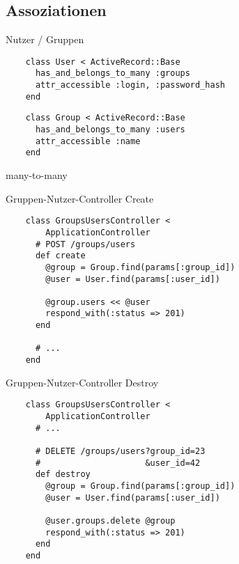 \subsection{Assoziationen}

\begin{frame}[fragile]{Nutzer / Gruppen}
  \begin{lstlisting}
    class User < ActiveRecord::Base
      has_and_belongs_to_many :groups
      attr_accessible :login, :password_hash
    end
  \end{lstlisting}

  \begin{lstlisting}
    class Group < ActiveRecord::Base
      has_and_belongs_to_many :users
      attr_accessible :name
    end
  \end{lstlisting}
\end{frame}

\begin{frame}{many-to-many}
  \begin{center}
    
  \end{center}
\end{frame}

\begin{frame}[fragile]{Gruppen-Nutzer-Controller Create}
  \begin{lstlisting}
    class GroupsUsersController < 
        ApplicationController
      # POST /groups/users
      def create
        @group = Group.find(params[:group_id])
        @user = User.find(params[:user_id])

        @group.users << @user
        respond_with(:status => 201)
      end

      # ...
    end
  \end{lstlisting}
\end{frame}

\begin{frame}[fragile]{Gruppen-Nutzer-Controller Destroy}
  \begin{lstlisting}
    class GroupsUsersController < 
        ApplicationController
      # ...

      # DELETE /groups/users?group_id=23
      #                     &user_id=42
      def destroy
        @group = Group.find(params[:group_id])
        @user = User.find(params[:user_id])

        @user.groups.delete @group
        respond_with(:status => 201)
      end
    end
  \end{lstlisting}
\end{frame}

